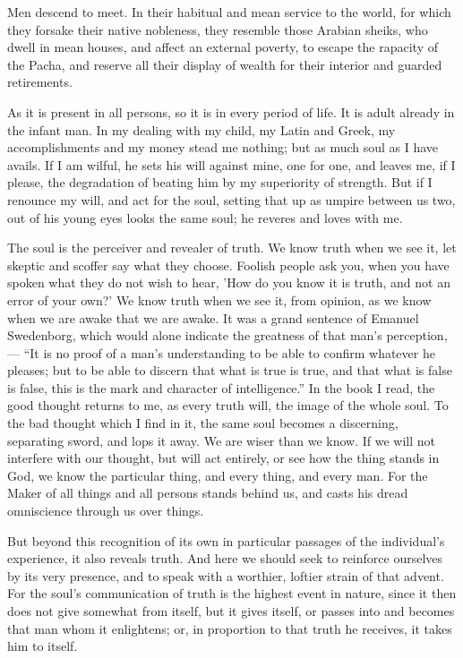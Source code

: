 \documentclass{article}
\begin{document}
Men descend to meet. In their habitual and mean service to the world, for which they forsake their native nobleness, they resemble those Arabian sheiks, who dwell in mean houses, and affect an external poverty, to escape the rapacity of the Pacha, and reserve all their display of wealth for their interior and guarded retirements.

As it is present in all persons, so it is in every period of life. It is adult already in the infant man. In my dealing with my child, my Latin and Greek, my accomplishments and my money stead me nothing; but as much soul as I have avails. If I am wilful, he sets his will against mine, one for one, and leaves me, if I please, the degradation of beating him by my superiority of strength. But if I renounce my will, and act for the soul, setting that up as umpire between us two, out of his young eyes looks the same soul; he reveres and loves with me.

The soul is the perceiver and revealer of truth. We know truth when we see it, let skeptic and scoffer say what they choose. Foolish people ask you, when you have spoken what they do not wish to hear, 'How do you know it is truth, and not an error of your own?' We know truth when we see it, from opinion, as we know when we are awake that we are awake. It was a grand sentence of Emanuel Swedenborg, which would alone indicate the greatness of that man's perception, --- ``It is no proof of a man's understanding to be able to confirm whatever he pleases; but to be able to discern that what is true is true, and that what is false is false, this is the mark and character of intelligence.'' In the book I read, the good thought returns to me, as every truth will, the image of the whole soul. To the bad thought which I find in it, the same soul becomes a discerning, separating sword, and lops it away. We are wiser than we know. If we will not interfere with our thought, but will act entirely, or see how the thing stands in God, we know the particular thing, and every thing, and every man. For the Maker of all things and all persons stands behind us, and casts his dread omniscience through us over things.

But beyond this recognition of its own in particular passages of the individual's experience, it also reveals truth. And here we should seek to reinforce ourselves by its very presence, and to speak with a worthier, loftier strain of that advent. For the soul's communication of truth is the highest event in nature, since it then does not give somewhat from itself, but it gives itself, or passes into and becomes that man whom it enlightens; or, in proportion to that truth he receives, it takes him to itself.
\end{document}

